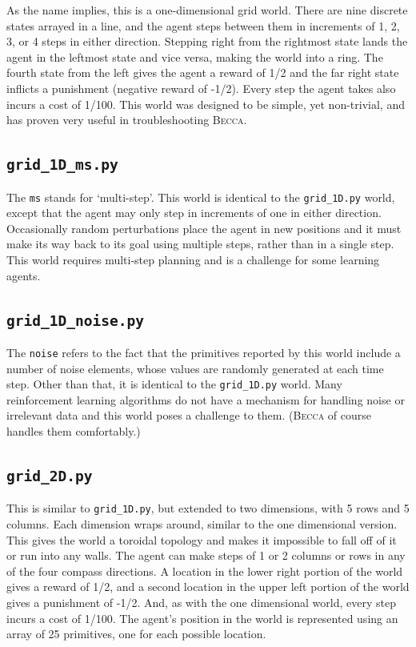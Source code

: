 As the name implies, this is a one-dimensional grid world. There are nine discrete states arrayed in a line, and the agent steps between them in increments of 1, 2, 3, or 4 steps in either direction. Stepping right from the rightmost state lands the agent in the leftmost state and vice versa, making the world into a ring. The fourth state from the left gives the agent a reward of 1/2 and the far right state inflicts a punishment (negative reward of -1/2). Every step the agent takes also incurs a cost of  1/100. This world was designed to be simple, yet non-trivial, and has proven very useful in troubleshooting \textsc{Becca}.

\subsection{\texttt{grid\_1D\_ms.py}}

The \texttt{ms} stands for `multi-step'. This world is identical to the \texttt{grid\_1D.py} world, except that the agent may only step in increments of one in either direction. Occasionally random perturbations place the agent in new positions and it must make its way back to its goal using multiple steps, rather than in a single step. This world requires multi-step planning and is a challenge for some learning agents.

\subsection{\texttt{grid\_1D\_noise.py}}

The \texttt{noise} refers to the fact that the primitives reported by this world include a number of noise elements, whose values are randomly generated at each time step. Other than that, it is identical to the  \texttt{grid\_1D.py} world. Many reinforcement learning algorithms do not have a mechanism for handling noise or irrelevant data and this world poses a challenge to them. (\textsc{Becca} of course handles them comfortably.)

\subsection{\texttt{grid\_2D.py}}

This is similar to \texttt{grid\_1D.py}, but extended to two dimensions, with 5 rows and 5 columns. Each dimension wraps around, similar to the one dimensional version. This gives the world a toroidal topology and makes it impossible to fall off of it or run into any walls. The agent can make steps of 1 or 2 columns or rows in any of the four compass directions. A location in the lower right portion of the world gives a reward of 1/2, and a second location in the upper left portion of the world gives a punishment of -1/2. And, as with the one dimensional world, every step incurs a cost of 1/100. The agent's position in the world is represented using an array of 25 primitives, one for each possible location. 

